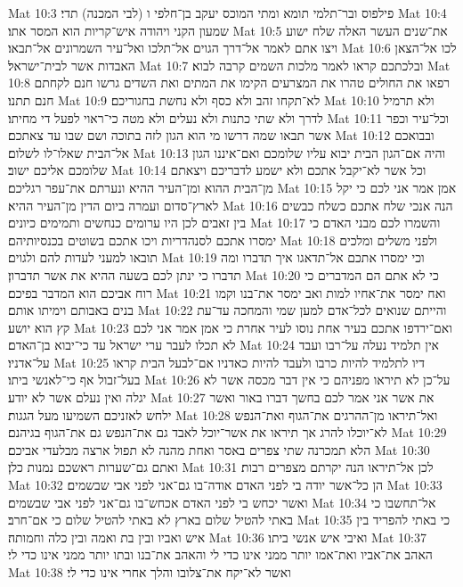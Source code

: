 Mat 10:3  פילפוס ובר־תלמי תומא ומתי המוכס יעקב בן־חלפי ו (לבי המכנה) תדי׃
Mat 10:4  שמעון הקני ויהודה איש־קריות הוא המסר אתו׃
Mat 10:5  את־שנים העשר האלה שלח ישוע ויצו אתם לאמר אל־דרך הגוים אל־תלכו ואל־עיר השמרונים אל־תבאו׃
Mat 10:6  לכו אל־הצאן האבדות אשר לבית־ישראל׃
Mat 10:7  ובלכתכם קראו לאמר מלכות השמים קרבה לבוא׃
Mat 10:8  רפאו את החולים טהרו את המצרעים הקימו את המתים ואת השדים גרשו חנם לקחתם חנם תתנו׃
Mat 10:9  לא־תקחו זהב ולא כסף ולא נחשת בחגוריכם׃
Mat 10:10  ולא תרמיל לדרך ולא שתי כתנות ולא נעלים ולא מטה כי־ראוי לפעל די מחיתו׃
Mat 10:11  וכל־עיר וכפר אשר תבאו שמה דרשו מי הוא הגון לזה בתוכה ושם שבו עד צאתכם׃
Mat 10:12  ובבואכם אל־הבית שאלו־לו לשלום׃
Mat 10:13  והיה אם־הגון הבית יבוא עליו שלומכם ואם־איננו הגון שלומכם אליכם ישוב׃
Mat 10:14  וכל אשר לא־יקבל אתכם ולא ישמע לדבריכם ויצאתם מן־הבית ההוא ומן־העיר ההיא ונערתם את־עפר רגליכם׃
Mat 10:15  אמן אמר אני לכם כי יקל לארץ־סדום ועמרה ביום הדין מן־העיר ההיא׃
Mat 10:16  הנה אנכי שלח אתכם כשלח כבשים בין זאבים לכן היו ערומים כנחשים ותמימים כיונים׃
Mat 10:17  והשמרו לכם מבני האדם כי ימסרו אתכם לסנהדריות ויכו אתכם בשוטים בכנסיותיהם׃
Mat 10:18  ולפני משלים ומלכים תובאו למעני לעדות להם ולגוים׃
Mat 10:19  וכי ימסרו אתכם אל־תדאגו איך תדברו ומה תדברו כי ינתן לכם בשעה ההיא את אשר תדברון׃
Mat 10:20  כי לא אתם הם המדברים כי רוח אביכם הוא המדבר בפיכם׃
Mat 10:21  ואח ימסר את־אחיו למות ואב ימסר את־בנו וקמו בנים באבותם וימיתו אותם׃
Mat 10:22  והייתם שנואים לכל־אדם למען שמי והמחכה עד־עת קץ הוא יושע׃
Mat 10:23  ואם־ירדפו אתכם בעיר אחת נוסו לעיר אחרת כי אמן אמר אני לכם לא תכלו לעבר ערי ישראל עד כי־יבוא בן־האדם׃
Mat 10:24  אין תלמיד נעלה על־רבו ועבד על־אדניו׃
Mat 10:25  דיו לתלמיד להיות כרבו ולעבד להיות כאדניו אם־לבעל הבית קראו בעל־זבול אף כי־לאנשי ביתו׃
Mat 10:26  על־כן לא תיראו מפניהם כי אין דבר מכסה אשר לא יגלה ואין נעלם אשר לא יודע׃
Mat 10:27  את אשר אני אמר לכם בחשך דברו באור ואשר ילחש לאזניכם השמיעו מעל הגגות׃
Mat 10:28  ואל־תיראו מן־ההרגים את־הגוף ואת־הנפש לא־יוכלו להרג אך תיראו את אשר־יוכל לאבד גם את־הנפש גם את־הגוף בגיהנם׃
Mat 10:29  הלא תמכרנה שתי צפרים באסר ואחת מהנה לא תפול ארצה מבלעדי אביכם׃
Mat 10:30  ואתם גם־שערות ראשכם נמנות כלן׃
Mat 10:31  לכן אל־תיראו הנה יקרתם מצפרים רבות׃
Mat 10:32  הן כל־אשר יודה בי לפני האדם אודה־בו גם־אני לפני אבי שבשמים׃
Mat 10:33  ואשר יכחש בי לפני האדם אכחש־בו גם־אני לפני אבי שבשמים׃
Mat 10:34  אל־תחשבו כי באתי להטיל שלום בארץ לא באתי להטיל שלום כי אם־חרב׃
Mat 10:35  כי באתי להפריד בין איש ואביו ובין בת ואמה ובין כלה וחמותה׃
Mat 10:36  ואיבי איש אנשי ביתו׃
Mat 10:37  האהב את־אביו ואת־אמו יותר ממני אינו כדי לי והאהב את־בנו ובתו יותר ממני אינו כדי לי׃
Mat 10:38  ואשר לא־יקח את־צלובו והלך אחרי אינו כדי לי׃
